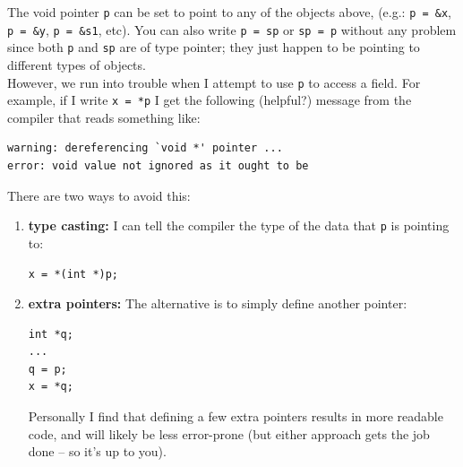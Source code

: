 \documentclass[12pt]{article}
\begin{document}
\noindent The void pointer \texttt{p} can be set to point to any of the objects above, (e.g.: \texttt{p = \&x}, \texttt{p = \&y}, \texttt{p = \&s1}, etc). You can also write \texttt{p = sp} or \texttt{sp = p} without any problem since both \texttt{p} and \texttt{sp} are of type pointer; they just happen to be pointing to different types of objects. \\

\noindent However, we run into trouble when I attempt to use \texttt{p} to access a field. For example, if I write \texttt{x = *p} I get the following (helpful?) message from the compiler that reads something like:

\begin{mdframed}[backgroundcolor=light-gray, innerleftmargin=10, innertopmargin=1,innerbottommargin=1,linecolor=light-gray]
\begin{lstlisting}
warning: dereferencing `void *' pointer ... 
error: void value not ignored as it ought to be
\end{lstlisting}
\end{mdframed}

\noindent There are two ways to avoid this:
\begin{enumerate}

\item \textbf{type casting:} I can tell the compiler the type of the data that \texttt{p} is pointing to:
\begin{mdframed}[backgroundcolor=light-gray, innerleftmargin=10, innertopmargin=3,innerbottommargin=0,linecolor=light-gray]
\begin{lstlisting}
x = *(int *)p;
\end{lstlisting}
\end{mdframed}

\item \textbf{extra pointers:} The alternative is to simply define another pointer:
\begin{mdframed}[backgroundcolor=light-gray, innerleftmargin=10, innertopmargin=1,innerbottommargin=1,linecolor=light-gray]
\begin{lstlisting}
int *q;
...
q = p;
x = *q;
\end{lstlisting}
\end{mdframed}
Personally I find that defining a few extra pointers results in more readable code, and will likely be less error-prone (but either approach gets the job done -- so it's up to you).
\end{enumerate}
\end{document}
